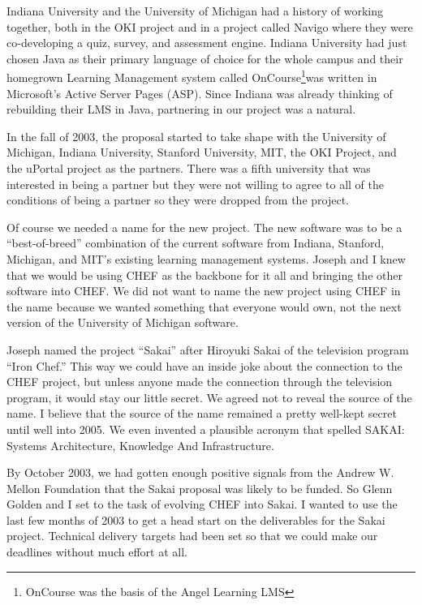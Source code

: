 \documentclass[12pt]{book}
\begin{document}
Indiana University and the University of Michigan had a history of working together, both
in the OKI project and in a project called Navigo where they were co-developing a
quiz, survey, and assessment engine.  Indiana University had just chosen Java
as their primary language of choice for the whole campus and their homegrown
Learning Management system called OnCourse\footnote{OnCourse was the basis of
the Angel Learning LMS}was written in Microsoft's Active Server Pages (ASP).  Since Indiana was
already thinking of rebuilding their LMS in Java, partnering in our project was a natural.

In the fall of 2003, the proposal started to take shape with the University of Michigan,
Indiana University, Stanford University, MIT, the OKI Project, and the uPortal project
as the partners.  There was a fifth university that was interested in being a partner
but they were not willing to agree to all of the conditions of being a partner so they
were dropped from the project.

Of course we needed a name for the new project.  The new software was to be a ``best-of-breed''
combination of the current software from Indiana, Stanford, Michigan, and MIT's existing
learning management systems.  Joseph and I knew that we would be using CHEF as the backbone
for it all and bringing the other software into CHEF.  We did not want to name the new project
using CHEF in the name because we wanted something that everyone would own, not the next version
of the University of Michigan software.

Joseph named the project ``Sakai'' after Hiroyuki Sakai
of the television program ``Iron Chef.''
This way we could have an inside joke about the connection to the CHEF project, but unless
anyone made the connection through the television program, it would stay our little secret.
We agreed not to reveal the source of the name.  I believe that the source of the name remained
a pretty well-kept secret until well into 2005.
We even invented a plausible acronym that spelled SAKAI:
Systems Architecture, Knowledge And Infrastructure.

By October 2003, we had gotten enough positive signals from the Andrew W. Mellon Foundation
that the Sakai proposal was likely to be funded.  So Glenn Golden and I set to the task of
evolving CHEF into Sakai.  I wanted to use the last few months of 2003 to get a head start
on the deliverables for the Sakai project.   Technical delivery targets had been set so that
we could make our deadlines without much effort at all.
\end{document}

